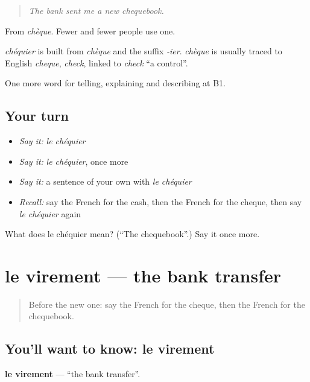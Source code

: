 \begin{quote}
\emph{The bank sent me a new chequebook.}
\end{quote}

From \emph{chèque}. Fewer and fewer people use one.

\begin{cousinweb}
\emph{chéquier} is built from \emph{chèque} and the suffix \emph{-ier}. \emph{chèque} is usually traced to English \emph{cheque}, \emph{check}, linked to \emph{check} \textquotedblleft{}a control\textquotedblright{}.
\end{cousinweb}

\begin{grammarlens}[title={What you've built}]
One more word for telling, explaining and describing at B1.
\end{grammarlens}

\subsection*{Your turn}
\begin{itemize}
\raggedright
  \item \emph{Say it:} \emph{le chéquier}
  \item \emph{Say it:} \emph{le chéquier}, once more
  \item \emph{Say it:} a sentence of your own with \emph{le chéquier}
  \item \emph{Recall:} say the French for the cash, then the French for the cheque, then say \emph{le chéquier} again
\end{itemize}

\begin{tcolorbox}[breakable,colback=teal!4,colframe=teal!35!black,title={Before you move on}]
What does le chéquier mean? (\textquotedblleft{}The chequebook\textquotedblright{}.) Say it once more.
\end{tcolorbox}
\section[le virement]{le virement — the bank transfer}

\label{lesson:FR-C392-virement}



\begin{quote}
Before the new one: say the French for the cheque, then the French for the chequebook.
\end{quote}

\subsection*{You'll want to know: le virement}
\textbf{le virement} — \textquotedblleft{}the bank transfer\textquotedblright{}.

